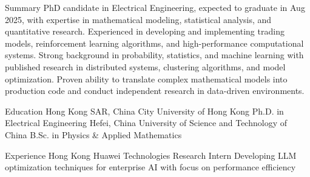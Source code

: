 \documentclass[caps, english]{financecv}
\begin{document}
\begin{cvsection}{Summary}
PhD candidate in Electrical Engineering, expected to graduate in Aug 2025, with expertise in mathematical modeling, statistical analysis, and quantitative research. Experienced in developing and implementing trading models, reinforcement learning algorithms, and high-performance computational systems. Strong background in probability, statistics, and machine learning with published research in distributed systems, clustering algorithms, and model optimization. Proven ability to translate complex mathematical models into production code and conduct independent research in data-driven environments.
\end{cvsection}

\begin{cvsection}{Education}
{Hong Kong SAR, China}
{City University of Hong Kong}
{Ph.D. in Electrical Engineering}
{}
{}
{}
{}
{Hefei, China}
{University of Science and Technology of China}
{B.Sc. in Physics \& Applied Mathematics}
{}
{}
{}
{}
\end{cvsection}

\begin{cvsection}{Experience}
{Hong Kong}
{Huawei Technologies}
{Research Intern}
{Developing LLM optimization techniques for enterprise AI with focus on performance efficiency}
{}
{}
{}
\end{cvsection}
\end{document}
